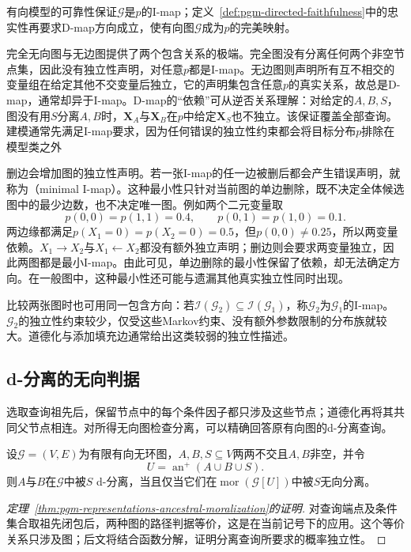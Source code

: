 有向模型的可靠性保证$\mathcal{G}$是$p$的I-map；定义~\ref{def:pgm-directed-faithfulness}中的忠实性再要求D-map方向成立，使有向图$\mathcal{G}$成为$p$的完美映射。

完全无向图与无边图提供了两个包含关系的极端。完全图没有分离任何两个非空节点集，因此没有独立性声明，对任意$p$都是I-map。无边图则声明所有互不相交的变量组在给定其他不交变量后独立，它的声明集包含任意$p$的真实关系，故总是D-map，通常却异于I-map。D-map的“依赖”可从逆否关系理解：对给定的$A,B,S$，图没有用$S$分离$A,B$时，$\bm{X}_A$与$\bm{X}_B$在$p$中给定$\bm{X}_S$也不独立。该保证覆盖全部查询。建模通常先满足I-map要求，因为任何错误的独立性约束都会将目标分布$p$排除在模型类之外

删边会增加图的独立性声明。若一张I-map的任一边被删后都会产生错误声明，就称为（minimal I-map）。这种最小性只针对当前图的单边删除，既不决定全体候选图中的最少边数，也不决定唯一图。例如两个二元变量取
\[
  p(0,0)=p(1,1)=0.4,\qquad
  p(0,1)=p(1,0)=0.1.
\]
两边缘都满足$p(X_1=0)=p(X_2=0)=0.5$，但$p(0,0)\ne0.25$，所以两变量依赖。$X_1\to X_2$与$X_1\leftarrow X_2$都没有额外独立声明；删边则会要求两变量独立，因此两图都是最小I-map。由此可见，单边删除的最小性保留了依赖，却无法确定方向。在一般图中，这种最小性还可能与遗漏其他真实独立性同时出现。

比较两张图时也可用同一包含方向：若$\mathcal{I}(\mathcal{G}_2)\subseteq\mathcal{I}(\mathcal{G}_1)$，称$\mathcal{G}_2$为$\mathcal{G}_1$的I-map。$\mathcal{G}_2$的独立性约束较少，仅受这些Markov约束、没有额外参数限制的分布族就较大。道德化与添加填充边通常给出这类较弱的独立性描述。

\subsection{d-分离的无向判据}
\label{sec:pgm-representations-ancestral-moralization}

选取查询祖先后，保留节点中的每个条件因子都只涉及这些节点；道德化再将其共同父节点相连。对所得无向图检查分离，可以精确回答原有向图的d-分离查询。

\begin{theorem}[祖先道德化判据]
  \label{thm:pgm-representations-ancestral-moralization}
  设$\mathcal{G}=(V,E)$为有限有向无环图，$A,B,S\subseteq V$两两不交且$A,B$非空，并令
  \[
    U=\operatorname{an}^{+}(A\cup B\cup S).
  \]
  则$A$与$B$在$\mathcal{G}$中被$S$ d-分离，当且仅当它们在$\operatorname{mor}(\mathcal{G}[U])$中被$S$无向分离。
\end{theorem}

\begin{proof}[定理~\ref{thm:pgm-representations-ancestral-moralization}的证明]
对查询端点及条件集合取祖先闭包后，两种图的路径判据等价，这是在当前记号下的应用。这个等价关系只涉及图；后文将结合函数分解，证明分离查询所要求的概率独立性。
\end{proof}

